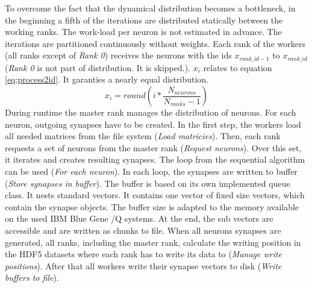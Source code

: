 To overcome the fact that the dynamical distribution becomes a bottleneck, in the beginning a fifth of the iterations are distributed
statically between the working ranks.
The work-load per neuron is not estimated in advance.
The iterations are partitioned continuously without weights.
Each rank of the workers (all ranks except of \emph{Rank 0}) receives the neurons with the ids $x_{rank\_id-1}$
to $x_{rank\_id}$ (\emph{Rank 0} is not part of distribution. It is skipped.).
$x_i$ relates to equation \ref{eq:process2id}. It garanties a nearly equal distribution.
\begin{equation}
	x_i = round(i * \frac{N_{neurons}}{N_{ranks}-1})
	\label{eq:process2id}
\end{equation}
During runtime the master rank manages the distribution of neurons. For each neuron, 
outgoing synapses have to be created. In the first step, the workers load all needed matrices from the file system (\emph{Load matricies}).
Then, each rank requests a set of neurons from the master rank (\emph{Request neurons}). Over this set, it iterates and creates resulting
synapses. The loop from the sequential algorithm can be used (\emph{For each neuron}).
In each loop, the synapses are written to buffer (\emph{Store synapses in buffer}).
The buffer is based on its own implemented queue class. It nests standard vectors.
It contains one vector of fixed size vectors, which contain the synapse objects.
The buffer size is adapted to 
the memory available on the used IBM Blue Gene /Q systems.
At the end, the sub vectors are accessible and are written as chunks to file.
When all neurons synapses are generated, all ranks, including the master rank, calculate the writing position
in the HDF5 datasets where each rank has to write its data to (\emph{Manage write positions}). After that all workers write their synapse vectors to
disk (\emph{Write buffers to file}).




